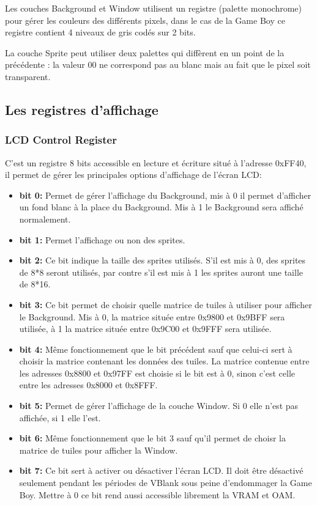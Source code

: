 \documentclass{report}
\begin{document}
Les couches Background et Window utilisent un registre (palette monochrome) pour gérer les
couleurs des différents pixels, dans le cas de la Game Boy ce registre contient
4 niveaux de gris codés sur 2 bits.

La couche Sprite peut utiliser deux palettes qui diffèrent en un point de la précédente : la valeur 00 ne correspond pas au blanc mais au fait que
le pixel soit transparent.\\

\subsection{Les registres d'affichage}
\subsubsection{LCD Control Register}
C'est un registre 8 bits accessible en lecture et écriture situé à l'adresse 0xFF40, il permet de gérer les principales options d'affichage de l'écran LCD:\\

\begin{itemize}
\item \textbf{bit 0:}
	Permet de gérer l'affichage du Background, mis à 0 il permet d'afficher un fond blanc à la place du Background. Mis à 1 le Background sera affiché normalement.\\
\item \textbf{bit 1:}
	Permet l'affichage ou non des sprites.\\
\item \textbf{bit 2:}
	Ce bit indique la taille des sprites utilisés. S'il est mis à 0, des sprites de 8*8 seront utilisés, par contre s'il est mis à 1 les sprites auront une taille de 8*16.\\
\item \textbf{bit 3:}
	Ce bit permet de choisir quelle matrice de tuiles à utiliser pour afficher le Background. Mis à 0, la matrice située entre 0x9800 et 0x9BFF sera utilisée, à 1 la matrice située entre 0x9C00 et 0x9FFF sera utilisée.\\
\item \textbf{bit 4:}
	Même fonctionnement que le bit précédent sauf que celui-ci sert à choisir la matrice contenant les données des tuiles. La matrice contenue entre les adresses 0x8800 et 0x97FF est choisie si le bit est à 0, sinon c'est celle entre les adresses 0x8000 et 0x8FFF.\\
\item \textbf{bit 5:}
	Permet de gérer l'affichage de la couche Window. Si 0 elle n'est pas affichée, si 1 elle l'est.\\
\item \textbf{bit 6:}
	Même fonctionnement que le bit 3 sauf qu'il permet de choisr la matrice de tuiles pour afficher la Window.\\
\item \textbf{bit 7:}
	Ce bit sert à activer ou désactiver l'écran LCD. Il doit être désactivé seulement pendant les périodes de VBlank sous peine d'endommager la Game Boy. Mettre à 0 ce bit rend aussi accessible librement la VRAM et OAM.\\
\end{itemize}
\end{document}
